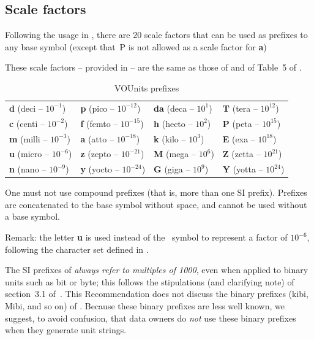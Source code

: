 \documentclass[11pt,notitlepage,onecolumn]{ivoa}
\newcommand{\unit}[1]{\textbf{\textsf{\color{orange}#1}}}
\def\micro{{\symbo \char109}}
\begin{document}
\subsection{Scale factors\label{sec:scaleFactors}}

Following the usage in , there are 20
scale factors that can be used as prefixes to any base symbol (except
that~P is not allowed as a scale factor
for \unit{a})

These scale factors -- provided in  --
 are the same as those of \citet{si-brochure} and of Table~5
 of \citet{pence10}.
\begin{table}
\begin{center}
\begin{tabular}{|l|l|l|l|}\hline
\unit{d} (deci -- $10^{-1}$)	&\unit{p} (pico -- $10^{-12}$) 	&\unit{da} (deca -- $10^{1}$)   	&\unit{T} (tera -- $10^{12}$)\\
\unit{c} (centi -- $10^{-2}$)	&\unit{f} (femto -- $10^{-15}$) &\unit{h} (hecto -- $10^{2}$) 	&\unit{P} (peta -- $10^{15}$)\\
\unit{m} (milli -- $10^{-3}$)	&\unit{a} (atto -- $10^{-18}$)  &\unit{k} (kilo -- $10^{3}$)	&\unit{E} (exa -- $10^{18}$)\\
\unit{u} (micro -- $10^{-6}$)	&\unit{z} (zepto -- $10^{-21}$) &\unit{M} (mega -- $10^{6}$) 	&\unit{Z} (zetta -- $10^{21}$)\\
\unit{n} (nano -- $10^{-9}$)	&\unit{y} (yocto -- $10^{-24}$) &\unit{G} (giga -- $10^{9}$)	&\unit{Y} (yotta -- $10^{24}$)\\\hline
\end{tabular}
\end{center}
\caption{\label{tab:vouscalefactors}VOUnits prefixes}
\end{table}


One must not use compound prefixes (that is,
more than one SI prefix). Prefixes are concatenated to the base
symbol without space, and cannot be used without a base symbol.

Remark: the letter \unit{u} is used instead of the \micro{}l to represent a factor of $10^{-6}$, 
following the character set defined in .

The SI prefixes of  \emph{always refer to
multiples of 1000}, even when applied to binary units such as bit or
byte; this follows the stipulations (and clarifying note) of
section~3.1 of~\citet{si-brochure}.
This Recommendation does not discuss the binary prefixes (kibi,
Mibi, and so on) of \citet[\S4]{std:iec80000-13}.  Because these
binary prefixes are less well known, we suggest, to avoid confusion,
that data owners do \emph{not} use these binary prefixes when they
generate unit strings.
\end{document}
